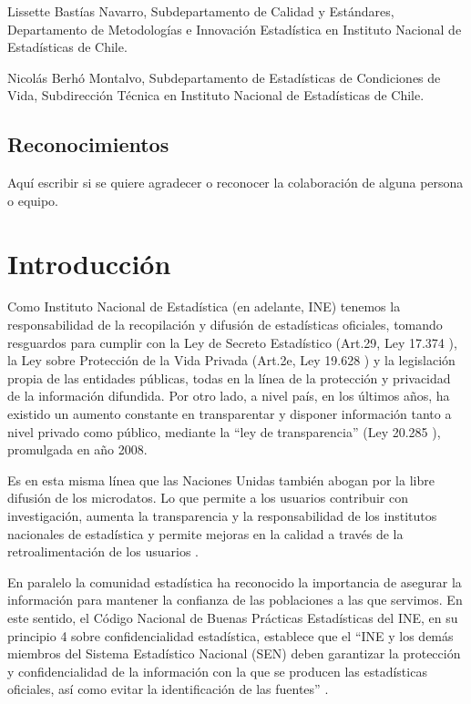 \documentclass[]{book}
\theoremstyle{definition}
\theoremstyle{definition}
\theoremstyle{definition}
\theoremstyle{definition}
\theoremstyle{remark}
\begin{document}
Lissette Bastías Navarro, Subdepartamento de Calidad y Estándares, Departamento de Metodologías e Innovación Estadística en Instituto Nacional de Estadísticas de Chile.

Nicolás Berhó Montalvo, Subdepartamento de Estadísticas de Condiciones de Vida, Subdirección Técnica en Instituto Nacional de Estadísticas de Chile.

\hypertarget{reconocimientos}{%
\section{Reconocimientos}\label{reconocimientos}}

Aquí escribir si se quiere agradecer o reconocer la colaboración de alguna persona o equipo.

\hypertarget{introducciuxf3n}{%
\chapter{Introducción}\label{introducciuxf3n}}

Como Instituto Nacional de Estadística (en adelante, INE) tenemos la responsabilidad de la recopilación y difusión de estadísticas oficiales, tomando resguardos para cumplir con la Ley de Secreto Estadístico (Art.29, Ley 17.374 \citep{ley1970}), la Ley sobre Protección de la Vida Privada (Art.2e, Ley 19.628 \citep{ley1999}) y la legislación propia de las entidades públicas, todas en la línea de la protección y privacidad de la información difundida. Por otro lado, a nivel país, en los últimos años, ha existido un aumento constante en transparentar y disponer información tanto a nivel privado como público, mediante la ``ley de transparencia'' (Ley 20.285 \citep{ley2008}), promulgada en año 2008.

Es en esta misma línea que las Naciones Unidas también abogan por la libre difusión de los microdatos. Lo que permite a los usuarios contribuir con investigación, aumenta la transparencia y la responsabilidad de los institutos nacionales de estadística y permite mejoras en la calidad a través de la retroalimentación de los usuarios \citep{nacionesunidas}.

En paralelo la comunidad estadística ha reconocido la importancia de asegurar la información para mantener la confianza de las poblaciones a las que servimos. En este sentido, el Código Nacional de Buenas Prácticas Estadísticas del INE, en su principio 4 sobre confidencialidad estadística, establece que el ``INE y los demás miembros del Sistema Estadístico Nacional (SEN) deben garantizar la protección y confidencialidad de la información con la que se producen las estadísticas oficiales, así como evitar la identificación de las fuentes'' \citep{institutonacionaldeestadisticas2015}.
\end{document}
